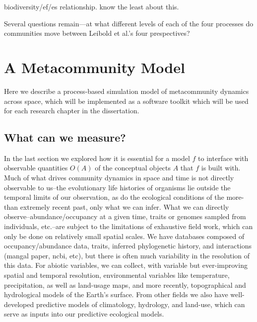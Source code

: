 \documentclass[]{article}
\begin{document}
biodiversity/ef/es relationship. know the least about this.

Several questions remain---at what different levels of each of the four
processes do communities move between Leibold et al.'s four
prespectives?



%
%
%

\hypertarget{a-metacommunity-model}{%
\section{A Metacommunity Model}\label{a-metacommunity-model}}

Here we describe a process-based simulation model of metacommunity
dynamics across space, which will be implemented as a software toolkit
which will be used for each research chapter in the dissertation.


\hypertarget{what-can-we-measure}{%
\subsection{What can we measure?}\label{what-can-we-measure}}

In the last section we explored how it is essential for a model \(f\) to
interface with observable quantities \(O(A)\) of the conceptual objects
\(A\) that \(f\) is built with. Much of what drives community dynamics
in space and time is not directly observable to us--the evolutionary
life histories of organisms lie outside the temporal limits of our
observation, as do the ecological conditions of the more-than extremely
recent past, only what we can infer. What we can directly
observe--abundance/occupancy at a given time, traits or genomes sampled
from individuals, etc.--are subject to the limitations of exhaustive
field work, which can only be done on relatively small spatial scales.
We have databases composed of occupancy/abundance data, traits, inferred
phylogenetic history, and interactions (mangal paper, ncbi, etc), but
there is often much variability in the resolution of this data. For
abiotic variables, we can collect, with variable but ever-improving
spatial and temporal resolution, environmental variables like
temperature, precipitation, as well as land-usage maps, and more
recently, topographical and hydrological models of the Earth's surface.
From other fields we also have well-developed predictive models of
climatology, hydrology, and land-use, which can serve as inputs into our
predictive ecological models.
\end{document}
